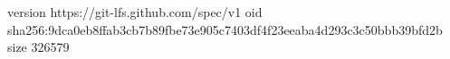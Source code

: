 version https://git-lfs.github.com/spec/v1
oid sha256:9dca0eb8ffab3cb7b89fbe73e905c7403df4f23eeaba4d293c3c50bbb39bfd2b
size 326579
